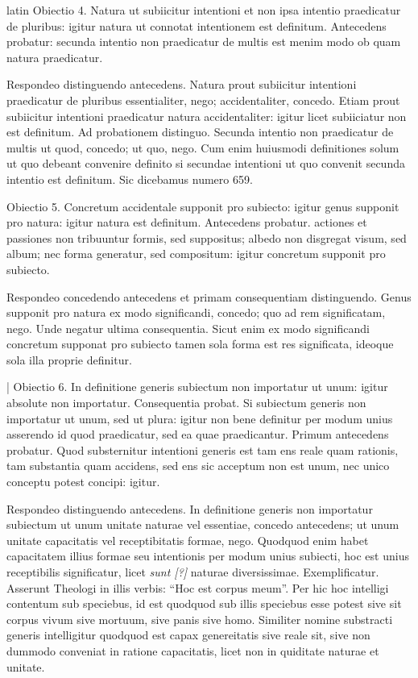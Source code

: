\begin{otherlanguage*}{latin}
\pstart
Obiectio 4. Natura ut subiicitur intentioni et non ipsa intentio praedicatur de pluribus:
igitur natura ut connotat intentionem est definitum. Antecedens probatur:
secunda intentio non praedicatur de multis est menim modo ob quam natura praedicatur. 
\pend

\pstart
Respondeo distinguendo antecedens. Natura prout subiicitur intentioni praedicatur de pluribus essentialiter, nego; accidentaliter, concedo. Etiam prout subiicitur intentioni praedicatur natura accidentaliter:
igitur licet subiiciatur non est definitum. Ad probationem distinguo. Secunda intentio non praedicatur de multis ut quod, concedo; ut quo, nego. Cum enim huiusmodi definitiones solum ut quo debeant convenire definito si secundae intentioni ut quo convenit secunda intentio est definitum. Sic dicebamus numero 659. 
\pend

\pstart
Obiectio 5. Concretum accidentale supponit pro subiecto:
igitur genus supponit pro natura:
igitur natura est definitum. Antecedens probatur. actiones et passiones non tribuuntur formis, sed suppositus; albedo non disgregat visum, sed album; nec forma generatur, sed compositum:
igitur concretum supponit pro subiecto. 
\pend

\pstart
Respondeo concedendo antecedens et primam consequentiam distinguendo. Genus supponit pro natura ex modo significandi, concedo; quo ad rem significatam, nego. Unde negatur ultima consequentia. Sicut enim ex modo significandi concretum supponat pro subiecto tamen sola forma est res significata, ideoque sola illa proprie definitur. 
\pend

\pstart
\textnormal{|} Obiectio 6. In definitione generis subiectum non importatur ut unum:
igitur absolute non importatur. Consequentia probat. Si subiectum generis non importatur ut unum, sed ut plura:
igitur non bene definitur per modum unius asserendo id quod praedicatur, sed ea quae praedicantur. Primum antecedens probatur. Quod substernitur intentioni generis est tam ens reale quam rationis, tam substantia quam accidens, sed ens sic acceptum non est unum, nec unico conceptu potest concipi:
igitur. 
\pend

\pstart
Respondeo distinguendo antecedens. In definitione generis non importatur subiectum ut unum unitate naturae vel essentiae, concedo antecedens; ut unum unitate capacitatis vel receptibitatis formae, nego. Quodquod enim habet capacitatem illius formae seu intentionis per modum unius subiecti, hoc est unius receptibilis significatur, licet \emph{sunt [?]} naturae diversissimae. Exemplificatur. Asserunt Theologi in illis verbis:
\enquote{Hoc est corpus meum}. Per hic hoc intelligi contentum sub speciebus, id est quodquod sub illis speciebus esse potest sive sit corpus vivum sive mortuum, sive panis sive homo. Similiter nomine substracti generis intelligitur quodquod est capax genereitatis sive reale sit, sive non dummodo conveniat in ratione capacitatis, licet non in quiditate naturae et unitate. 
\pend


\end{otherlanguage*}
